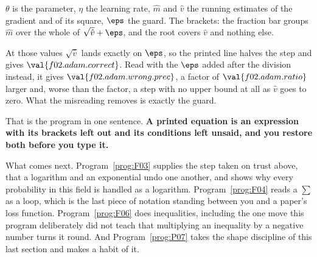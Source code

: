 \begin{fr}
\begin{ansblock}
$\theta$ is the parameter, $\eta$ the learning rate, $\hat{m}$ and $\hat{v}$
the running estimates of the gradient and of its square, $\eps$ the guard. The
brackets: the fraction bar groups $\hat{m}$ over the whole of
$\sqrt{\hat{v}} + \eps$, and the root covers $\hat{v}$ and nothing else.
\begin{center}
\end{center}
At those values $\sqrt{\hat{v}}$ lands exactly on $\eps$, so the printed line
halves the step and gives $\val{f02.adam.correct}$. Read with the $\eps$ added
after the division instead, it gives $\val{f02.adam.wrong.prec}$, a factor of
$\val{f02.adam.ratio}$ larger \dash{} and, worse than the factor, a step with
no upper bound at all as $\hat{v}$ goes to zero. What the misreading removes is
exactly the guard.
\end{ansblock}

That is the program in one sentence. \textbf{A printed equation is an
expression with its brackets left out and its conditions left unsaid, and you
restore both before you type it.}

What comes next. Program~\ref{prog:F03} supplies the step taken on trust above,
that a logarithm and an exponential undo one another, and shows why every
probability in this field is handled as a logarithm.
Program~\ref{prog:F04} reads a $\sum$ as a loop, which is the last piece of
notation standing between you and a paper's loss function.
Program~\ref{prog:F06} does inequalities, including the one move this program
deliberately did not teach \dash{} that multiplying an inequality by a negative
number turns it round. And Program~\ref{prog:P07} takes the shape discipline of
this last section and makes a habit of it.
\end{fr}

